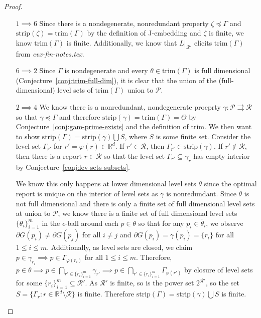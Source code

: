 \documentclass[12pt]{article}
\newcommand{\Comments}{1}
\newcommand{\mynote}[2]{\ifnum\Comments=1\textcolor{#1}{#2}\fi}
\newcommand{\jessie}[1]{\mynote{purple}{[JF: #1]}}
\newcommand{\reals}{\mathbb{R}}
\renewcommand{\P}{\mathcal{P}}
\newcommand{\R}{\mathcal{R}}
\newcommand{\inter}[1]{\mathring{#1}}%
\newcommand{\toto}{\rightrightarrows}
\newcommand{\trim}{\mathrm{trim}}
\newcommand{\strip}{\mathrm{strip}}
\begin{document}
\begin{proof}
\begin{enumerate}
\item [$1 \implies 6$]
Since there is a nondegenerate, nonredundant property $\zeta \preceq \Gamma$ and $\strip(\zeta) = \trim(\Gamma)$ by the definition of J-embedding and $\zeta$ is finite, we know $\trim(\Gamma)$ is finite.
Additionally, we know that $L|_{\R'}$ elicits $\trim(\Gamma)$ from \emph{cvx-fin-notes.tex}.

\item [$6 \implies 2$]
Since $\Gamma$ is nondegenerate and every $\theta \in \trim(\Gamma)$ is full dimensional (Conjecture~\ref{conj:trim-full-dim}), it is clear that the union of the (full-dimensional) level sets of $\trim(\Gamma)$ union to $\P$.


\item [$2 \implies 4$]
	We know there is a nonredundant, nondegenerate proeprty $\gamma : \P \toto \R$ so that $\gamma \preceq \Gamma$ and therefore $\strip(\gamma) = \trim(\Gamma) = \Theta$ by Conjecture~\ref{conj:gam-prime-exists} and the definition of trim.
	We then want to show $\strip(\Gamma) = \strip(\gamma) \bigcup S$, where $S$ is some finite set.
	Consider the level set $\Gamma_{r'}$ for $r' = \varphi(r) \in \reals^d$.
	If $r' \in \R$, then $\Gamma_{r'} \in \strip(\gamma)$.
	If $r' \not \in \R$, then there is a report $r \in \R$ so that the level set $\Gamma_{r'} \subseteq \gamma_r$ has empty interior by Conjecture~\ref{conj:lev-sets-subsets}.
			
	We know this only happens at lower dimensional level sets $\theta$ since the optimal report is unique on the interior of level sets as $\gamma$ is nonredundant.
	Since $\theta$ is not full dimensional and there is only a finite set of full dimensional level sets at union to $\P$, we know there is a finite set of full dimensional level sets $\{\theta_i\}_{i=1}^m$ in the $\epsilon$-ball around each $p \in \theta$ so that for any $p_i \in \inter{\theta_i}$, we observe $\partial G(p_i) \neq \partial G(p_j)$ for all $i \neq j$ and $\partial G(p_i) = \gamma(p_i) = \{r_i\}$ for all $1 \leq i \leq m$.
	Additionally, as level sets are closed, we claim $p \in \gamma_{r_i} \implies p \in \Gamma_{\varphi(r_i)}$ for all $1 \leq i \leq m$.
	Therefore, $p \in \theta \implies p \in \bigcap_{r' \in \{r_i\}_{i=1}^m} \gamma_{r'}\implies p \in \bigcap_{r' \in \{r_i\}_{i=1}^m} \Gamma_{\varphi(r')}$ by closure of level sets for some $\{r_i\}_{i=1}^m \subseteq \R'$.
	As $\R'$ is finite, so is the power set $2^{\R'}$, so the set $S = \{\Gamma_r : r \in \reals^d \setminus \R \}$ is finite.
	Therefore $\strip(\Gamma) = \strip(\gamma) \bigcup S$ is finite. 
		


\end{enumerate}
\end{proof}
\end{document}
